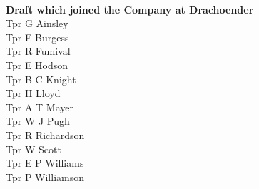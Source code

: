 \begin{multicols}{2}
  \\
  \textbf{Draft which joined the Company at Drachoender} \\
  Tpr G Ainsley \\
  Tpr E Burgess \\
  Tpr R Fumival \\
  Tpr E Hodson \\
  Tpr B C Knight \\
  Tpr H Lloyd \\
  Tpr A T Mayer \\
  Tpr W J Pugh \\
  Tpr R Richardson \\
  Tpr W Scott \\
  Tpr E P Williams \\
  Tpr P Williamson \\
\end{multicols}
